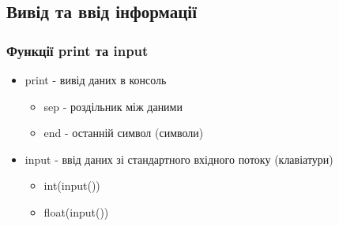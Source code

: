 \subsection{Вивід та ввід інформації}

\begin{frame}
\frametitle{Функції print та input}
\begin{itemize}
  \item print - вивід даних в консоль
      \begin{itemize}
        \item sep - роздільник між даними
        \item end - останній символ (символи)
     \end{itemize} 
  \item input - ввід даних зі стандартного вхідного потоку (клавіатури)
      \begin{itemize}
        \item int(input())
        \item float(input())
     \end{itemize}
 \end{itemize} 
\end{frame}
